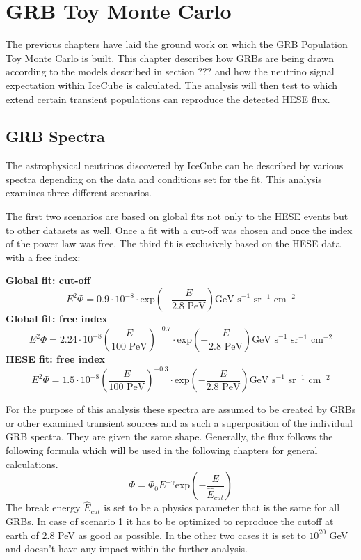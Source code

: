 \section{GRB Toy Monte Carlo}
\label{sec:GRBTMC}
The previous chapters have laid the ground work on which the GRB Population Toy
Monte Carlo is built. This chapter describes how GRBs are being drawn according
to the models described in section ??? and how the neutrino signal expectation
within IceCube is calculated. The analysis will then test to which extend 
certain transient populations can reproduce the detected HESE flux. 

\subsection{GRB Spectra}
\label{sec:GRBSpectra}
The astrophysical neutrinos discovered by IceCube can be described by various
spectra depending on the data and conditions set for the fit. This
analysis examines three different scenarios.

The first two scenarios are based on global fits not only to the HESE events but
to other datasets as well. Once a fit with a cut-off was chosen and once the
index of the power law was free. The third fit is exclusively based on the HESE
data with a free index:

{\bf Global fit: cut-off}
\begin{equation}
 E^2 \Phi = 0.9 \cdot 10^{-8} \cdot \text{exp}\left(-\frac{E}{2.8 \text{ PeV}}
\right) \text{GeV s}^{-1} \text{ sr}^{-1} \text{ cm}^{-2}
\end{equation}
{\bf Global fit: free index}
\begin{equation}
 E^2 \Phi = 2.24 \cdot 10^{-8} \left(\frac{E}{100 \text{ PeV}} \right)^{-0.7}
\cdot \text{exp}\left(-\frac{E}{2.8 \text{ PeV}}
\right) \text{GeV s}^{-1} \text{ sr}^{-1} \text{ cm}^{-2}
\end{equation}
{\bf HESE fit: free index}
\begin{equation}
 E^2 \Phi = 1.5 \cdot 10^{-8} \left(\frac{E}{100 \text{ PeV}} \right)^{-0.3}
\cdot \text{exp}\left(-\frac{E}{2.8 \text{ PeV}}
\right) \text{GeV s}^{-1} \text{ sr}^{-1} \text{ cm}^{-2}
\end{equation}

For the purpose of this analysis these spectra are assumed to be created by
GRBs or other examined transient sources and as such a superposition of the
individual GRB spectra. They are given the same shape.
Generally, the flux follows the following formula which will be used in the
following chapters for general calculations.
\begin{equation}
\label{eq:HESEflux_gen}
 \Phi = \Phi_0 E^{-\gamma} \text{exp} \left(-\frac{E}{\hat{E}_{cut}} \right)
\end{equation}
The break energy $\hat{E}_{cut}$ is set to be a physics parameter that is the
same for all GRBs. In case of scenario 1 it has to be optimized to reproduce
the cutoff at earth of 2.8 PeV as good as possible. In the other two cases it
is set to $10^{20}$ GeV and doesn't have any impact within the further analysis.









